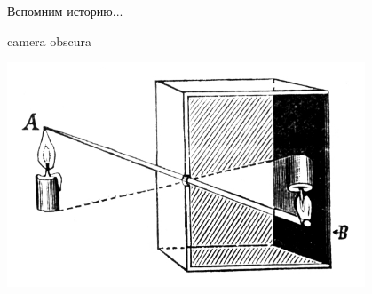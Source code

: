 \documentclass[9pt, compress, xcolor=table]{beamer}
\begin{document}
\begin{frame}{Вспомним историю...}

camera obscura

\begin{center}
\includegraphics[width=0.8\textwidth]{obscura}
\end{center}



\end{frame}
\end{document}
